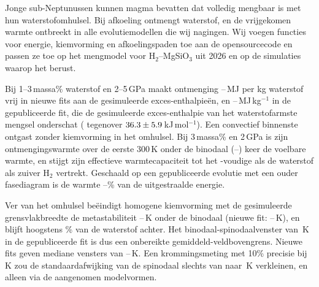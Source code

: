 \begin{narrowtext}
Jonge sub-Neptunussen kunnen magma bevatten dat volledig mengbaar is met hun
waterstofomhulsel. Bij afkoeling ontmengt waterstof, en de vrijgekomen warmte ontbreekt in
alle evolutiemodellen die wij nagingen. Wij voegen functies voor energie,
kiemvorming en afkoelingspaden toe aan de opensourcecode \Atm{} en passen ze toe op het
mengmodel voor H$_2$--MgSiO$_3$ uit 2026 en op de simulaties waarop het berust.\par
\vspace{3pt}
Bij 1--3\,massa\% waterstof en 2--5\,GPa maakt ontmenging \hbarMOneLo{}--\hbarMOneHi{}\,MJ per
kg waterstof vrij in nieuwe fits aan de gesimuleerde exces-enthalpie\"en, en
\hbarPubLo{}--\hbarPubHi{}\,MJ\,kg$^{-1}$ in de gepubliceerde fit, die de gesimuleerde
exces-enthalpie van het waterstofarmste mengsel onderschat (\edHexPub{} tegenover
$36.3\pm5.9$\,kJ\,mol$^{-1}$). Een convectief binnenste ontgast zonder
kiemvorming in het omhulsel. Bij 3\,massa\% en 2\,GPa is zijn ontmengingswarmte over de eerste
300\,K onder de binodaal \intRatioThree{} (\intRatioThreeLo{}--\intRatioThreeHi{}) keer de
voelbare warmte, en stijgt zijn effectieve warmtecapaciteit tot het \intCeffThree{}-voudige als
de waterstof als zuiver H$_2$ vertrekt. Geschaald op een gepubliceerde evolutie met een ouder
fasediagram is de warmte \planetRadiatedLo{}--\planetRadiatedHi{}\% van de uitgestraalde
energie.\par
\vspace{3pt}
Ver van het omhulsel be\"eindigt homogene kiemvorming met de gesimuleerde grensvlakbreedte de
metastabiliteit \dlyFigOneCPubLo{}--\dlyFigOneCPubHi{}\,K onder de binodaal (nieuwe fit:
\dlyFigOneCMOneLo{}--\dlyFigOneCMOneHi{}\,K), en blijft hoogstens \whFigOneCPubHi{}\% van de
waterstof achter. Het binodaal-spinodaalvenster van \pubIntTwo{}\,K in de gepubliceerde fit
is dus een onbereikte gemiddeld-veldbovengrens. Nieuwe fits geven mediane
vensters van \IntRangeLo{}--\IntRangeHi{}\,K. Een krommingsmeting met 10\% precisie bij
\curvT{}\,K zou de standaardafwijking van de spinodaal slechts van \designSdNow{} naar
\curvSdPooled{}\,K verkleinen, en alleen via de aangenomen modelvormen.
\end{narrowtext}
